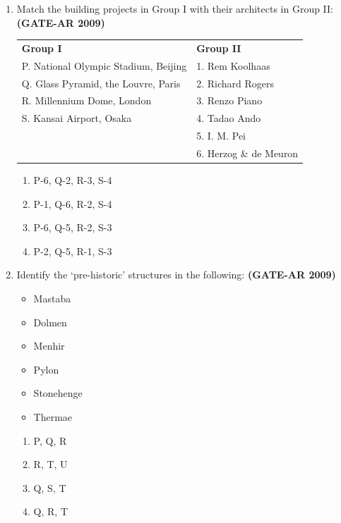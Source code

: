 \documentclass[a4paper,10pt]{article}
\begin{document}
\begin{enumerate}
    \item Match the building projects in Group I with their architects in Group II: \hfill \textbf{(GATE-AR 2009)} \\
    \begin{tabular}{ l l }
	\textbf{Group I} & \textbf{Group II} \\
	P. National Olympic Stadium, Beijing & 1. Rem Koolhaas \\
	Q. Glass Pyramid, the Louvre, Paris & 2. Richard Rogers \\
	R. Millennium Dome, London & 3. Renzo Piano \\
	S. Kansai Airport, Osaka & 4. Tadao Ando \\
	& 5. I. M. Pei \\
	& 6. Herzog \& de Meuron \\
	\end{tabular}
	\begin{multicols}{2}
	\begin{enumerate}
        \item P-6, Q-2, R-3, S-4
        \item P-1, Q-6, R-2, S-4
        \item P-6, Q-5, R-2, S-3
        \item P-2, Q-5, R-1, S-3
    \end{enumerate}
	\end{multicols}

    \item Identify the ‘pre-historic’ structures in the following: \hfill \textbf{(GATE-AR 2009)}
    \begin{itemize}
        \item Mastaba
        \item Dolmen
        \item Menhir
        \item Pylon
        \item Stonehenge
        \item Thermae
    \end{itemize}
    \begin{multicols}{4}
	\begin{enumerate}
        \item P, Q, R
        \item R, T, U
        \item Q, S, T
        \item Q, R, T
    \end{enumerate}
	\end{multicols}


\end{enumerate}
\end{document}
